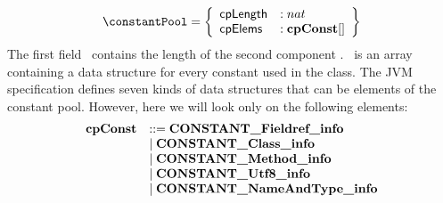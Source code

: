 $$ 
\begin{array}{l}
         \constantPool = \left\{\begin{array}{ll} \cpLength    & :   nat \\
                                                  \cpElems   & :   \classConst [ ]
	                        \end{array} \right\}
   \end{array} 
$$
The first field \cpLength \  contains the length of the second component \cpElems. \cpElems \
is an array containing a data structure for every constant used in the class. The JVM specification defines
 seven kinds of data structures that can be elements of the constant pool.
However, here we will look only on the following elements:
$$ \begin{array}{ll}\mbox{\rm\textbf{cpConst}} & ::=   \mbox{\rm\textbf{CONSTANT\_Fieldref\_info}} \\
		     & \mid \mbox{\rm\textbf{CONSTANT\_Class\_info}} \\
		     & \mid \mbox{\rm\textbf{CONSTANT\_Method\_info}}\\
		      & \mid \mbox{\rm \textbf{CONSTANT\_Utf8\_info}} \\
		      & \mid \mbox{\rm \textbf{CONSTANT\_NameAndType\_info}}
                    \end{array}$$


